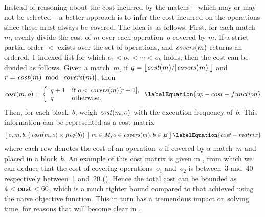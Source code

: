 Instead of reasoning about the cost incurred by the \glspl{match} -- which may
or may not be selected -- a better approach is to infer the cost incurred on the
\glspl{operation} since these must always be covered.
%
The idea is as follows.
%
First, for each \gls{match}~$m$, evenly divide the cost of $m$ over each
\gls{operation}~$o$ covered by $m$.
%
If a strict partial order $<$ exists over the set of \glspl{operation}, and
$\operatorname{\textrm{\textit{covers}}}(m)$ returns an ordered, 1-indexed list for which \mbox{$o_1 < o_2 <
  \cdots < o_k$} holds, then the cost can be divided as follows.
%
Given a match~$m$, if \mbox{$q = \lfloor \mCost(m) / \mCard{\!\mCovers(m)}
  \rfloor$} and \mbox{$r = \mCost(m) \! \mod \mCard{\!\mCovers(m)}$}, then
%
\begin{equation}
  \mOpCost(m, o) =
  \left\{
  \begin{array}{ll}
    q + 1 & \text{if $o < \mCovers(m)[r+1]$}, \\
    q     & \text{otherwise}. \\
  \end{array}
  \right.
  \labelEquation{op-cost-function}
\end{equation}
%
Then, for each \gls{block}~$b$, weigh \mbox{$\operatorname{\textrm{\textit{cost}}}(m, o)$} with the execution
frequency of~$b$.
%
This information can be represented as a cost matrix
%
\begin{equation}
  \begin{bmatrix}
    \begin{array}{@{\:}c|c@{\:}}
        o, m, b, \big( \mOpCost(m, o) \times \mFreq(b) \big)
      & m \in \mMatchSet, o \in \mCovers(m), b \in \mBlockSet
    \end{array}
  \end{bmatrix}
  \labelEquation{cost-matrix}
\end{equation}
where each row denotes the cost of an \gls{operation}~$o$ if covered by a
\gls{match}~$m$ and placed in a \gls{block}~$b$.
%
An example of this cost matrix is given in , from which
we can deduce that the cost of covering operations~$o_1$ and~$o_2$ is between~3
and~40 respectively between~1 and~20 ().
%
Hence the total cost can be bounded as \mbox{$4 < \mVar{cost} < 60$}, which is a
much tighter bound compared to that achieved using the naive \gls{objective
  function}.
%
This in turn has a tremendous impact on solving time, for reasons that will
become clear in .

